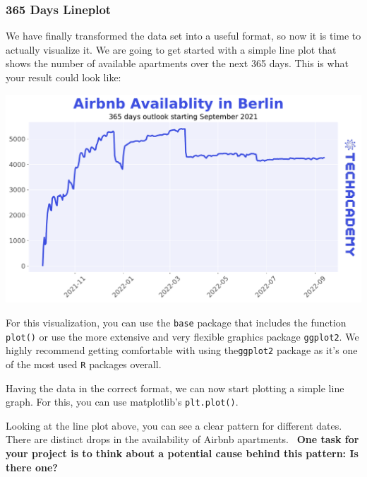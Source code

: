\documentclass[
  11pt,
]{article}
\newenvironment{tips}[1]
  {
  \begin{itemize}
  \footnotesize
  \renewcommand{\labelitemi}{
    \raisebox{-.7\height}[0pt][0pt]{
      {\setkeys{Gin}{width=3em,keepaspectratio}
        \texttt{[image: images/\#1.png]}}
    }
  }
  \setlength{\fboxsep}{1em}
  \begin{rbox}
  \item
  }
  {
  \end{rbox}
  \end{itemize}
  }
\newenvironment{tipsp}[1]
  {
  \begin{itemize}
  \footnotesize
  \renewcommand{\labelitemi}{
    \raisebox{-.7\height}[0pt][0pt]{
      {\setkeys{Gin}{width=3em,keepaspectratio}
        \texttt{[image: images/\#1.png]}}
    }
  }
  \setlength{\fboxsep}{1em}
  \begin{pbox}
  \item
  }
  {
  \end{pbox}
  \end{itemize}
  }
\begin{document}
\hypertarget{days-lineplot}{%
\subsubsection{365 Days Lineplot}\label{days-lineplot}}

We have finally transformed the data set into a useful format, so now it is time to actually visualize it.
We are going to get started with a simple line plot that shows the number of available apartments over the next 365 days.
This is what your result could look like:

\begin{center}\includegraphics[width=1\linewidth]{plot/01_python/availability} \end{center}

\begin{tips}r
For this visualization, you can use the \texttt{base} package that includes the function \texttt{plot()} or use the more extensive and very flexible graphics package \texttt{ggplot2}.
We highly recommend getting comfortable with using the\texttt{ggplot2} package as it's one of the most used \texttt{R} packages overall.

\end{tips}

\begin{tipsp}p
Having the data in the correct format, we can now start plotting a simple line graph.
For this, you can use matplotlib's \texttt{plt.plot()}.

\end{tipsp}

Looking at the line plot above, you can see a clear pattern for different dates.
There are distinct drops in the availability of Airbnb apartments.~
\textbf{One task for your project is to think about a potential cause behind this pattern: Is there one?}
\end{document}
